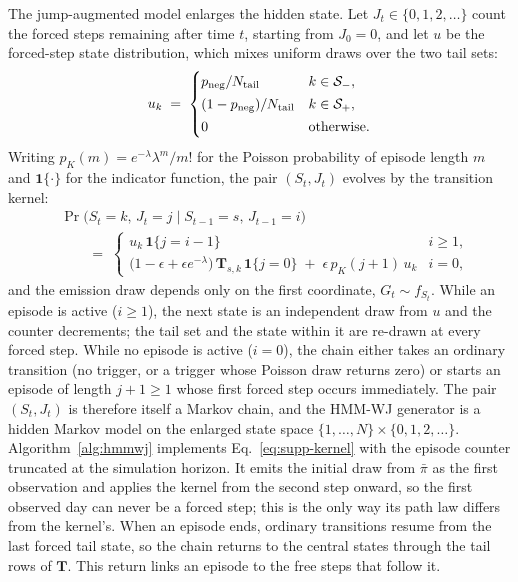 The jump-augmented model enlarges the hidden state. Let
$J_t \in \{0, 1, 2, \dots\}$ count the forced steps remaining after
time $t$, starting from $J_0 = 0$, and let $u$ be the forced-step
state distribution, which
mixes uniform draws over the two tail sets:
\begin{equation}
  u_k \;=\;
  \begin{cases}
    p_{\rm neg}/N_{\rm tail} & k \in \mathcal{S}_{-},\\[2pt]
    (1 - p_{\rm neg})/N_{\rm tail} & k \in \mathcal{S}_{+},\\[2pt]
    0 & \text{otherwise}.
  \end{cases}
  \label{eq:supp-u}
\end{equation}
Writing $p_K(m) = e^{-\lambda} \lambda^m / m!$ for the Poisson
probability of episode length $m$ and $\mathbf{1}\{\cdot\}$ for the
indicator function, the pair $(S_t, J_t)$ evolves by the transition
kernel:
\begin{equation}
\begin{aligned}
  &\Pr\big(S_t = k,\, J_t = j \mid S_{t-1} = s,\, J_{t-1} = i\big) \\
  &\qquad=\;
  \begin{cases}
    u_k\, \mathbf{1}\{j = i - 1\} & i \ge 1,\\[6pt]
    \big(1 - \epsilon + \epsilon e^{-\lambda}\big)\,
      \mathbf{T}_{s, k}\, \mathbf{1}\{j = 0\}
      \;+\; \epsilon\, p_K(j + 1)\, u_k & i = 0,
  \end{cases}
\end{aligned}
  \label{eq:supp-kernel}
\end{equation}
and the emission draw depends only on the first coordinate,
$G_t \sim f_{S_t}$.  While an episode is
active ($i \ge 1$), the next state is an independent draw from $u$ and
the counter decrements; the tail set and the state within it are
re-drawn at every forced step. While no episode is active ($i = 0$),
the chain either takes an ordinary transition (no trigger, or a
trigger whose Poisson draw returns zero) or starts an episode of
length $j + 1 \ge 1$ whose first forced step occurs immediately. The
pair $(S_t, J_t)$ is therefore itself a Markov chain, and the HMM-WJ
generator is a hidden Markov model on the enlarged state space
$\{1, \dots, N\} \times \{0, 1, 2, \dots\}$. Algorithm~\ref{alg:hmmwj}
implements Eq.~\eqref{eq:supp-kernel} with the episode counter
truncated at the simulation horizon. It emits the initial draw from
$\bar\pi$ as the first observation and applies the kernel from the
second step onward, so the first observed day can never be a forced
step; this is the only way its path law differs from the kernel's.
When an episode ends, ordinary transitions resume from the last forced
tail state, so the chain returns to the central states through the
tail rows of $\mathbf{T}$. This return links an episode to the free steps that follow it.

